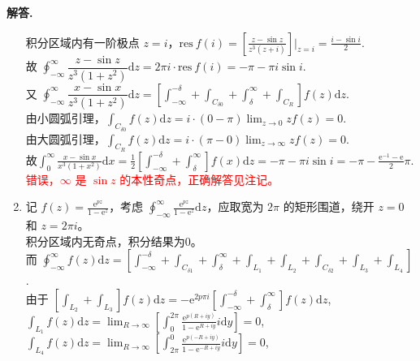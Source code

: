 \documentclass[11pt]{ctexart}
\newenvironment{solution}{\par\noindent\textbf{解答. }}{\par}
\begin{document}
\begin{solution}
\begin{enumerate}[(1)]
              积分区域内有一阶极点 $z = i$，$\displaystyle\text{res}\ f(i) = \left[\frac{z-\sin{z}}{z^3(z+i)}\right]\Bigg|_{z=i} = \frac{i-\sin{i}}{2}$.\\[12pt]
              故 $\displaystyle\oint_{-\infty}^{\infty}\dfrac{z-\sin{z}}{z^3(1+z^2)}\text{d}z = 2\pi i\cdot\text{res}\ f(i) = -\pi - \pi i\sin{i}$.\\[12pt]
              又 $\displaystyle\oint_{-\infty}^{\infty}\dfrac{x-\sin{x}}{z^3(1+z^2)}\text{d}z
              = \left[\int_{-\infty}^{-\delta} + \int_{C_{\delta0}}
              + \int_{\delta}^{\infty} + \int_{C_R}\right]f(z)\text{d}z$. \\[12pt]
              由小圆弧引理，$\displaystyle\int_{C_{\delta0}}f(z)\text{d}z = i\cdot\left(0-\pi\right)\lim_{z\to0}zf(z) = 0$. \\[12pt]
              由大圆弧引理，$\displaystyle\int_{C_R}f(z)\text{d}z = i\cdot\left(\pi-0\right)\lim_{z\to\infty}zf(z) = 0$. \textcolor{red}{\XSolid}\\[12pt]
              故$\displaystyle\int_{0}^{\infty}\frac{x-\sin{x}}{x^3(1+x^2)}\text{d}x
              = \frac{1}{2}\left[\int_{-\infty}^{-\delta} + \int_{\delta}^{\infty}\right]f(x)\text{d}z
              = -\pi - \pi i\sin{i}
              = -\pi - \frac{\text{e}^{-1}-\text{e}}{2}\pi$. \\[12pt]
              \textcolor{red}{错误，$\infty$ 是 $\sin{z}$ 的本性奇点，正确解答见注记。}
        \item 记 $\displaystyle f(z) = \frac{\text{e}^{pz}}{1-\text{e}^z}$，考虑 $\displaystyle\oint_{-\infty}^{\infty}\frac{\text{e}^{pz}}{1-\text{e}^z}\text{d}z$，应取宽为 $2\pi$ 的矩形围道，绕开 $z=0$ 和 $z=2\pi i$。 \\[12pt]
              积分区域内无奇点，积分结果为0。\\[12pt]
              而 $\displaystyle\oint_{-\infty}^{\infty}f(z)\text{d}z = \left[\int_{-\infty}^{-\delta}
              + \int_{C_{\delta1}} + \int_{\delta}^{\infty} + \int_{L_1}
              + \int_{L_2} + \int_{C_{\delta2}} +\int_{L_3} + \int_{L_4}\right]$. \\[12pt]
              由于 $\displaystyle\left[\int_{L_2} + \int_{L_3}\right]f(z)\text{d}z = -\text{e}^{2p\pi i}\left[\int_{-\infty}^{-\delta}+\int_{\delta}^{\infty}\right]f(z)\text{d}z$, \\[12pt]
              $\displaystyle\int_{L_1}f(z)\text{d}z = \lim_{R\to\infty}\left[\int_{0}^{2\pi}\frac{\text{e}^{p(R+iy)}}{1-\text{e}^{R+iy}}i\text{d}y\right] = 0$,\quad
              $\displaystyle\int_{L_4}f(z)\text{d}z = \lim_{R\to\infty}\left[\int_{2\pi}^{0}\frac{\text{e}^{p(-R+iy)}}{1-\text{e}^{-R+iy}}i\text{d}y\right] = 0$, \\[12pt]

\end{enumerate}
\end{solution}
\end{document}
